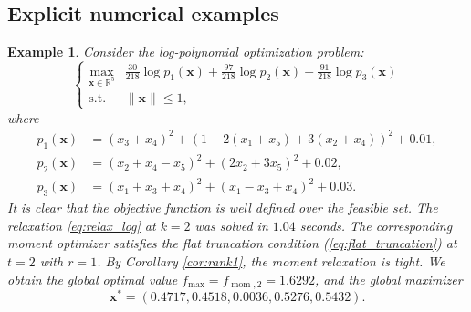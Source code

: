 \documentclass[pdflatex,sn-mathphys-num]{sn-jnl}%
\newcommand{\reff}[1]{(\ref{#1})}
\newcommand{\rd}[1]{{\color{red}#1}}
\newcommand{\vect}[1]{\boldsymbol{#1}}
\newcommand{\st}{\mathrm{s.t.}}
\theoremstyle{thmstyleone}%
\theoremstyle{thmstyletwo}%
\newtheorem{example}{Example}%
\theoremstyle{thmstylethree}%
\begin{document}
\subsection{Explicit numerical examples}

\begin{example}\label{ex:88}
	Consider the log-polynomial optimization problem:
	\begin{equation*}
		\left\{\begin{array}{cl}
			\max\limits_{\vect{x} \in \mathbb{R}^5} & 
			\frac{30}{218} \log p_1(\vect{x}) + \frac{97}{218} \log p_2(\vect{x}) + \frac{91}{218} \log p_3(\vect{x}) \\
			\st & \| \vect{x} \| \leq 1,
		\end{array}\right.
	\end{equation*}
	where
	\begin{equation*}
		\begin{array}{rl}
			p_1(\vect{x})  & = (x_3+x_4)^2 + \left(1+2(x_1+x_5)+3(x_2+x_4) \right)^2 + 0.01, \\
			p_2(\vect{x})  & = (x_2+x_4-x_5)^2 + (2x_2+3x_5)^2 + 0.02,  \\
			p_3(\vect{x})  & = (x_1+x_3+x_4)^2 + (x_1-x_3+x_4)^2 + 0.03.
		\end{array}
	\end{equation*} 
	It is clear that the objective function is well defined 
	over the feasible set. 
	\rd{The relaxation \eqref{eq:relax_log} at $k=2$ was solved in
	$1.04$ seconds.}
	The corresponding moment optimizer satisfies the flat truncation 
	condition \reff{eq:flat_truncation} at $t=2$ with $r=1$.
	By Corollary \ref{cor:rank1}, the moment relaxation is tight.
	We obtain the global optimal value
	$f_{\max} = f_{\operatorname{mom},2} = 1.6292$, 
	and the global maximizer
	\begin{equation*}
		\vect{x}^* = (0.4717, 0.4518, 0.0036, 0.5276, 0.5432).
	\end{equation*} 
\end{example}
\end{document}
